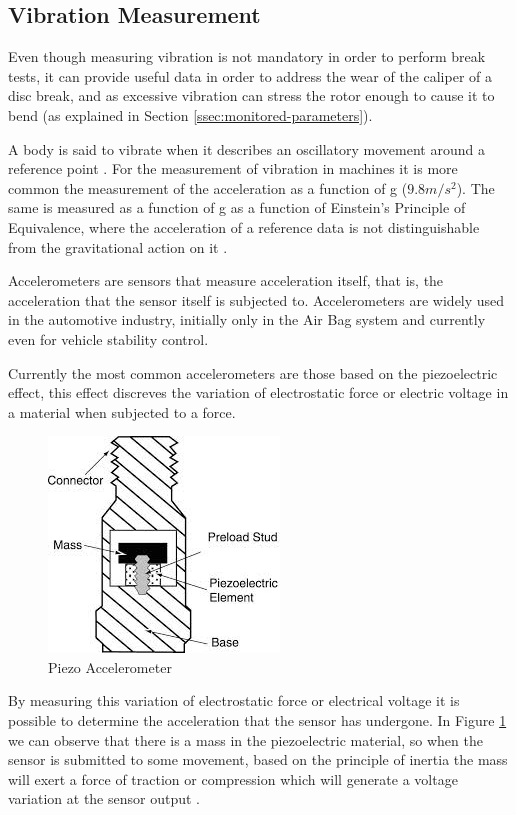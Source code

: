 \subsection{Vibration Measurement}\label{ssec:vibrationMeasurement}
		
		Even though measuring vibration is not mandatory in order to perform break tests, it can provide useful data in order to address the wear of the caliper of a disc break, and as excessive vibration can stress the rotor enough to cause it to bend (as explained in Section \ref{ssec:monitored-parameters}).
		\par
		A body is said to vibrate when it describes an oscillatory movement around a reference point \cite{joaocan2000}. For the measurement of vibration in machines it is more common the measurement of the acceleration as a function of g ($9.8m/s^2$). The same is measured as a function of g as a function of Einstein's Principle of Equivalence, where the acceleration of a reference data is not distinguishable from the gravitational action on it \cite{nordtvedt1968equivalence}.
		\par
		Accelerometers are sensors that measure acceleration itself, that is, the acceleration that the sensor itself is subjected to. Accelerometers are widely used in the automotive industry, initially only in the Air Bag system and currently even for vehicle stability control.
		\par
		Currently the most common accelerometers are those based on the piezoelectric effect, this effect discreves the variation of electrostatic force or electric voltage in a material when subjected to a force.

		\begin{figure}[htbp]
			\centering
				\includegraphics[scale=0.7]{figuras/fig-piezo-acel.jpg}
			\caption{Piezo Accelerometer \cite{piezo-accel}}
			\label{fig:piezoAccelerometer}
		\end{figure}

		By measuring this variation of electrostatic force or electrical voltage it is possible to determine the acceleration that the sensor has undergone. In Figure \ref{fig:piezoAccelerometer} we can observe that there is a mass in the piezoelectric material, so when the sensor is submitted to some movement, based on the principle of inertia the mass will exert a force of traction or compression which will generate a voltage variation at the sensor output \cite{patrick2006}.

